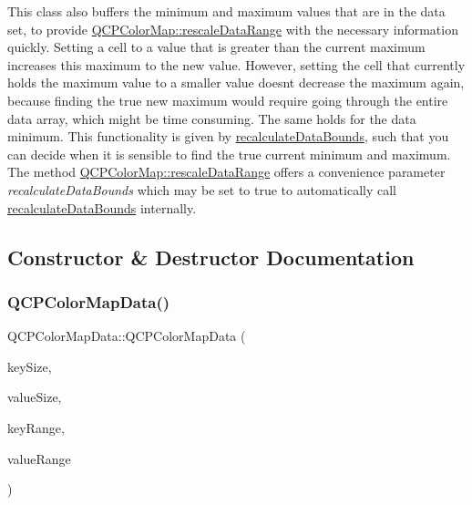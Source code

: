 This class also buffers the minimum and maximum values that are in the data set, to provide \hyperlink{classQCPColorMap_a856608fa3dd1cc290bcd5f29a5575774}{Q\+C\+P\+Color\+Map\+::rescale\+Data\+Range} with the necessary information quickly. Setting a cell to a value that is greater than the current maximum increases this maximum to the new value. However, setting the cell that currently holds the maximum value to a smaller value doesn\textquotesingle{}t decrease the maximum again, because finding the true new maximum would require going through the entire data array, which might be time consuming. The same holds for the data minimum. This functionality is given by \hyperlink{classQCPColorMapData_ab235ade8a4d64bd3adb26a99b3dd57ee}{recalculate\+Data\+Bounds}, such that you can decide when it is sensible to find the true current minimum and maximum. The method \hyperlink{classQCPColorMap_a856608fa3dd1cc290bcd5f29a5575774}{Q\+C\+P\+Color\+Map\+::rescale\+Data\+Range} offers a convenience parameter {\itshape recalculate\+Data\+Bounds} which may be set to true to automatically call \hyperlink{classQCPColorMapData_ab235ade8a4d64bd3adb26a99b3dd57ee}{recalculate\+Data\+Bounds} internally. 

\subsection{Constructor \& Destructor Documentation}
\mbox{\label{classQCPColorMapData_aac9d8eb81e18e240d89d56c01933fd23}} 
\subsubsection{\texorpdfstring{Q\+C\+P\+Color\+Map\+Data()}{QCPColorMapData()}\hspace{0.1cm}{\footnotesize\ttfamily [1/2]}}
{\footnotesize\ttfamily Q\+C\+P\+Color\+Map\+Data\+::\+Q\+C\+P\+Color\+Map\+Data (\begin{DoxyParamCaption}\item[{int}]{key\+Size,  }\item[{int}]{value\+Size,  }\item[{const \hyperlink{classQCPRange}{Q\+C\+P\+Range} \&}]{key\+Range,  }\item[{const \hyperlink{classQCPRange}{Q\+C\+P\+Range} \&}]{value\+Range }\end{DoxyParamCaption})}

